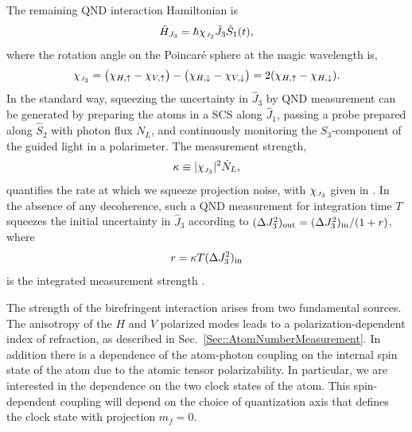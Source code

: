 \documentclass[preprint, aps,pra,onecolumn]{revtex4-1} %
\newcommand{\inp}{{\rm in}}
\newcommand{\jx}{\hat{J}_1}
\newcommand{\jz}{\hat{J}_3}
\newcommand{\chieff}{\chi_{\raisebox{-.1pt}{\tiny $J_3$}}}
\begin{document}
The remaining QND interaction Hamiltonian is
	\begin{equation} \label{Eq::FaradayHam}
		\hat{H}_{J_3} = \hbar \chieff \jz \hat{S}_1(t),
	\end{equation}
where the rotation angle on the Poincar\'{e} sphere at the magic wavelength is,
\begin{equation}\label{eq:chiJ3}
\chieff = \big( \chi_{H, \uparrow} - \chi_{V,\uparrow} \big) - \big(\chi_{H,\downarrow} - \chi_{V,\downarrow} \big) = 2(\chi_{H, \uparrow}-\chi_{H, \downarrow}).
\end{equation}
In the standard way, squeezing the uncertainty in $\jz$ by QND measurement can be generated by preparing the atoms in a SCS along $\jx$, passing a probe prepared along $\hat{S}_2$ with photon flux $\dot{N}_L$, and continuously monitoring the $S_3$-component of the guided light in a polarimeter. The measurement strength,
	\begin{align} \label{Eq::MeasurementStrength}
		\kappa \equiv |\chieff|^2 \dot{N}_L, 
	\end{align}
quantifies the rate at which we squeeze projection noise, with $\chieff$ given in . 
In the absence of any decoherence, such a QND measurement for integration time $T$ squeezes the initial uncertainty in $\jz$ according to $(\Delta J_3^2)_{\rm out}= (\Delta J_3^2)_{\rm in}/(1+r)$, where
	\begin{equation}
		r = \kappa T  (\Delta J_3^2)_{\inp}
	\end{equation}
is the integrated measurement strength \cite{hammerer_quantum_2010, baragiola_three-dimensional_2014}.

The strength of the birefringent interaction arises from two fundamental sources.  The anisotropy of the   $H$ and $V$ polarized modes leads to a polarization-dependent index of refraction, as described in Sec.~\ref{Sec::AtomNumberMeasurement}.  In addition there is a dependence of the atom-photon coupling on the internal spin state of the atom due to the atomic tensor polarizability.  In particular, we are interested in the dependence on the two clock states of the atom.  This spin-dependent coupling will depend on the choice of quantization axis that defines the clock state with projection $m_f=0$. 
\end{document}
